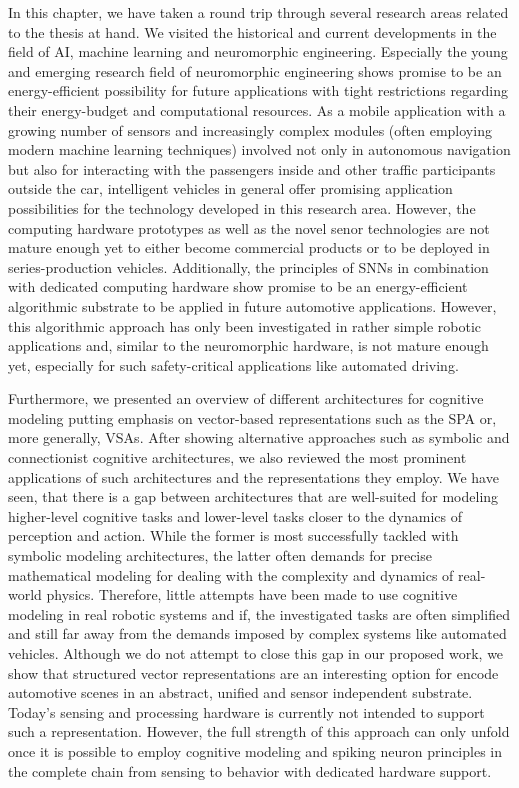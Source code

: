In this chapter, we have taken a round trip through several research areas related to the thesis at hand.
We visited the historical and current developments in the field of \ac{AI}, machine learning and neuromorphic engineering.
Especially the young and emerging research field of neuromorphic engineering shows promise to be an energy-efficient possibility for future applications with tight restrictions regarding their energy-budget and computational resources.
As a mobile application with a growing number of sensors and increasingly complex modules (often employing modern machine learning techniques) involved not only in autonomous navigation but also for interacting with the passengers inside and other traffic participants outside the car, intelligent vehicles in general offer promising application possibilities for the technology developed in this research area.
However, the computing hardware prototypes \cite{Furber2014, Akopyan2015, Davies2018} as well as the novel senor technologies \cite{Lichtsteiner2008} are not mature enough yet to either become commercial products or to be deployed in series-production vehicles.
Additionally, the principles of \acp{SNN} in combination with dedicated computing hardware show promise to be an energy-efficient algorithmic substrate to be applied in future automotive applications.
However, this algorithmic approach has only been investigated in rather simple robotic applications \cite{Conradt2014, Stewart2016, Galluppi2014} and, similar to the neuromorphic hardware, is not mature enough yet, especially for such safety-critical applications like automated driving.

Furthermore, we presented an overview of different architectures for cognitive modeling putting emphasis on vector-based representations such as the \ac{SPA} or, more generally, \acp{VSA}.
After showing alternative approaches such as symbolic and connectionist cognitive architectures, we also reviewed the most prominent applications of such architectures and the representations they employ.
We have seen, that there is a gap between architectures that are well-suited for modeling higher-level cognitive tasks and lower-level tasks closer to the dynamics of perception and action.
While the former is most successfully tackled with symbolic modeling architectures, the latter often demands for precise mathematical modeling for dealing with the complexity and dynamics of real-world physics.
Therefore, little attempts have been made to use cognitive modeling in real robotic systems and if, the investigated tasks are often simplified \cite{Neubert2016} and still far away from the demands imposed by complex systems like automated vehicles.
Although we do not attempt to close this gap in our proposed work, we show that structured vector representations are an interesting option for encode automotive scenes in an abstract, unified and sensor independent substrate.
Today's sensing and processing hardware is currently not intended to support such a representation.
However, the full strength of this approach can only unfold once it is possible to employ cognitive modeling and spiking neuron principles in the complete chain from sensing to behavior with dedicated hardware support.

